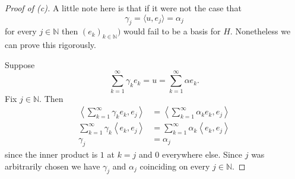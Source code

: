 \begin{proof}[Proof of (c)]
    A little note here is that if it were not the case 
    that 
    \[
        \gamma_j = \langle u, e_j \rangle 
        = \alpha_j 
    \]
    for every $j \in \mathbb N$ then $(e_k)_{k\in\mathbb N})$ would 
    fail to be a basis for $H$. Nonetheless we can prove this 
    rigorously.

    Suppose 
    \[
        \sum_{k=1}^\infty \gamma_k e_k 
        = u = 
        \sum_{k=1}^\infty \alpha e_k.
    \]
    Fix $j \in \mathbb N$. Then
    \begin{align*}
        \left\langle \sum_{k=1}^\infty 
        \gamma_k e_k, e_j \right\rangle
        &= 
        \left\langle \sum_{k=1}^\infty 
        \alpha_k e_k, e_j \right\rangle \\ 
        \sum_{k=1}^\infty \gamma_k \left\langle e_k, e_j \right\rangle
        &= 
        \sum_{k=1}^\infty \alpha_k \left\langle e_k, e_j \right\rangle
        \\
        \gamma_j &= \alpha_j
    \end{align*}
    since the inner product is $1$ at $k = j$ and $0$ everywhere 
    else. Since $j$ was arbitrarily chosen we have $\gamma_j$ 
    and $\alpha_j$ coinciding on every $j \in \mathbb N$.
\end{proof}

